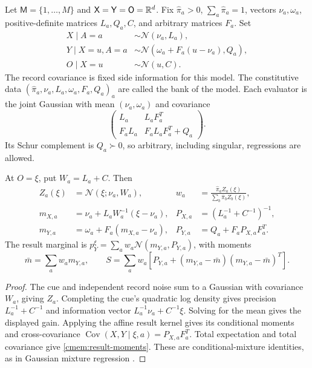 Let $\mathsf M=\{1,\ldots,M\}$ and $\mathsf X=\mathsf Y=\mathsf O=\mathbb R^d$. Fix $\hat\pi_a>0$, $\sum_a\hat\pi_a=1$, vectors $\nu_a,\omega_a$, positive-definite matrices $L_a,Q_a,C$, and arbitrary matrices $F_a$. Set
\begin{equation}
 \begin{aligned}
 X\mid A=a&\sim\mathcal N(\nu_a,L_a),\\
 Y\mid X=u,A=a&\sim\mathcal N(\omega_a+F_a(u-\nu_a),Q_a),\\
 O\mid X=u&\sim\mathcal N(u,C).
 \end{aligned}
 \label{cmem:gaussian-model}
\end{equation}
The record covariance is fixed side information for this model. The constitutive data $(\hat\pi_a,\nu_a,L_a,\omega_a,F_a,Q_a)_a$ are called the bank of the model. Each evaluator is the joint Gaussian with mean $(\nu_a,\omega_a)$ and covariance
\begin{equation}
 \begin{pmatrix}
 L_a&L_aF_a^T\\ F_aL_a&F_aL_aF_a^T+Q_a
 \end{pmatrix}.
 \label{cmem:joint-covariance}
\end{equation}
Its Schur complement is $Q_a\succ0$, so arbitrary, including singular, regressions are allowed.

At $O=\xi$, put $W_a=L_a+C$. Then
\begin{equation}
 \begin{aligned}
 Z_a(\xi)&=\mathcal N(\xi;\nu_a,W_a),&
 w_a&=\frac{\hat\pi_a Z_a(\xi)}{\sum_b\hat\pi_bZ_b(\xi)},\\
 m_{X,a}&=\nu_a+L_aW_a^{-1}(\xi-\nu_a),&
 P_{X,a}&=(L_a^{-1}+C^{-1})^{-1},\\
 m_{Y,a}&=\omega_a+F_a(m_{X,a}-\nu_a),&
 P_{Y,a}&=Q_a+F_aP_{X,a}F_a^T.
 \end{aligned}
 \label{cmem:gaussian-posterior-formula}
\end{equation}
The result marginal is $p_Y^\xi=\sum_aw_a\mathcal N(m_{Y,a},P_{Y,a})$, with moments
\begin{equation}
 \bar m=\sum_aw_am_{Y,a},\qquad
 S=\sum_aw_a\left[P_{Y,a}+(m_{Y,a}-\bar m)(m_{Y,a}-\bar m)^T\right].
 \label{cmem:result-moments}
\end{equation}
\begin{proof}
The cue and independent record noise sum to a Gaussian with covariance $W_a$, giving $Z_a$. Completing the cue's quadratic log density gives precision $L_a^{-1}+C^{-1}$ and information vector $L_a^{-1}\nu_a+C^{-1}\xi$. Solving for the mean gives the displayed gain. Applying the affine result kernel gives its conditional moments and cross-covariance $\operatorname{Cov}(X,Y\mid\xi,a)=P_{X,a}F_a^T$. Total expectation and total covariance give \cref{cmem:result-moments}. These are conditional-mixture identities, as in Gaussian mixture regression \citep{Calinon2016}.
\end{proof}

